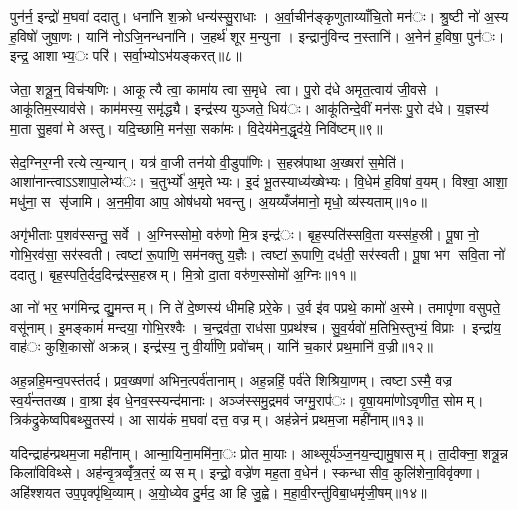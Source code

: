 
पुन॑र्न॒ इन्द्रो॑ म॒घवा॑ ददातु। धना॑नि श॒क्रो धन्य॑स्सु॒राधाः। अ॒र्वा॒चीन॑ङ्कृणुताय्याँचि॒तो मन॑ः। श्रु॒ष्टी नो॑ अ॒स्य ह॒विषो॑ जुषा॒णः। यानि॑ नोऽजि॒नन्धना॑नि। ज॒हर्थ॑ शूर म॒न्युना। इन्द्रानु॑विन्द न॒स्तानि॑। अ॒नेन॑ ह॒विषा॒ पुन॑ः। इन्द्र॒ आशाभ्य॒ः परि॑। सर्वा॒भ्योऽभ॑यङ्करत्॥८॥

जेता॒ शत्रू॒न्॒ विच॑ऱ्षणिः। आकूत्यै त्वा॒ कामा॑य त्वा स॒मृधे त्वा। पु॒रो द॑धे अमृत॒त्वाय॑ जी॒वसे। आकू॑तिम॒स्याव॑से। काम॑मस्य॒ समृ॑द्ध्यै। इन्द्र॑स्य युञ्जते॒ धिय॑ः। आकू॑तिन्दे॒वीं मन॑सः पु॒रो द॑धे। य॒ज्ञस्य॑ मा॒ता सु॒हवा॑ मे अस्तु। यदि॒च्छामि॒ मन॑सा॒ सका॑मः। वि॒देय॑मेन॒द्धृद॑ये॒ निवि॑ष्टम्॥९॥

सेद॒ग्निर॒ग्नीरत्येत्य॒न्यान्। यत्र॑ वा॒जी तन॑यो वी॒डुपा॑णिः। स॒हस्र॑पाथा अ॒ख्षरा॑ स॒मेति॑। आशा॑नान्त्वाऽऽशापा॒लेभ्य॑ः। च॒तुर्भ्यो॑ अ॒मृतेभ्यः। इ॒दं भू॒तस्याध्य॑ख्षेभ्यः। वि॒धेम॑ ह॒विषा॑ व॒यम्। विश्वा॒ आशा॒ मधु॑ना॒ स सृ॑जामि। अ॒न॒मी॒वा आप॒ ओष॑धयो भवन्तु। अ॒यय्यँज॑मानो॒ मृधो॒ व्य॑स्यताम्॥१०॥

अगृ॑भीताः प॒शव॑स्सन्तु॒ सर्वे। अ॒ग्निस्सोमो॒ वरु॑णो मि॒त्र इन्द्र॑ः। बृह॒स्पति॑स्सवि॒ता यस्स॑ह॒स्री। पू॒षा नो॒ गोभि॒रव॑सा॒ सर॑स्वती। त्वष्टा॑ रू॒पाणि॒ सम॑नक्तु य॒ज्ञैः। त्वष्टा॑ रू॒पाणि॒ दध॑ती॒ सर॑स्वती। पू॒षा भग सवि॒ता नो॑ ददातु। बृह॒स्पति॒र्दद॒दिन्द्र॑स्स॒हस्रम्। मि॒त्रो दा॒ता वरु॑ण॒स्सोमो॑ अ॒ग्निः॥११॥


आ नो॑ भर॒ भग॑मिन्द्र द्यु॒मन्तम्। नि ते॑ दे॒ष्णस्य॑ धीमहि प्ररे॒के। उ॒र्व इ॑व पप्रथे॒ कामो॑ अ॒स्मे। तमापृ॑णा वसुपते॒ वसू॑नाम्। इ॒मङ्कामं॑ मन्दया॒ गोभि॒रश्वैः। च॒न्द्रव॑ता॒ राध॑सा प॒प्रथ॑श्च। सु॒व॒र्यवो॑ म॒तिभि॒स्तुभ्यं॒ विप्राः। इन्द्रा॑य॒ वाह॑ः कुशि॒कासो॑ अक्रन्न्। इन्द्र॑स्य॒ नु वी॒र्या॑णि॒ प्रवो॑चम्। यानि॑ च॒कार॑ प्रथ॒मानि॑ व॒ज्री॥१२॥

अह॒न्नहि॒मन्व॒पस्त॑तर्द। प्रव॒ख्षणा॑ अभिन॒त्पर्व॑तानाम्। अह॒न्नहिं॒ पर्व॑ते शिश्रिया॒णम्। त्वष्टाऽस्मै॒ वज्र स्व॒र्य॑न्ततख्ष। वा॒श्रा इ॑व धे॒नव॒स्स्यन्द॑मानाः। अञ्ज॑स्समु॒द्रमव॑ जग्मु॒राप॑ः। वृ॒षा॒यमा॑णोऽवृणीत॒ सोमम्। त्रिक॑द्रुकेष्वपिबथ्सु॒तस्य॑। आ साय॑कं म॒घवा॑ दत्त॒ वज्रम्। अह॑न्नेनं प्रथम॒जा मही॑नाम्॥१३॥

यदिन्द्राह॑न्प्रथम॒जा मही॑नाम्। आन्मा॒यिना॒ममि॑ना॒ः प्रोत मा॒याः। आथ्सूर्य॑ञ्ज॒नय॒न्द्यामु॒षासम्। ता॒दीक्ना॒ शत्रू॒न्न किला॑विविथ्से। अह॑न्वृ॒त्रव्वृँ॑त्र॒तरं॒ व्यसम्। इन्द्रो॒ वज्रे॑ण मह॒ता व॒धेन॑। स्कन्धासीव॒ कुलि॑शेना॒विवृ॑क्णा। अहि॑श्शयत उप॒पृक्पृ॑थि॒व्याम्। अ॒यो॒ध्येव दु॒र्मद॒ आ हि जु॒ह्वे। म॒हा॒वी॒रन्तु॑विबा॒धमृ॑जी॒षम्॥१४॥


